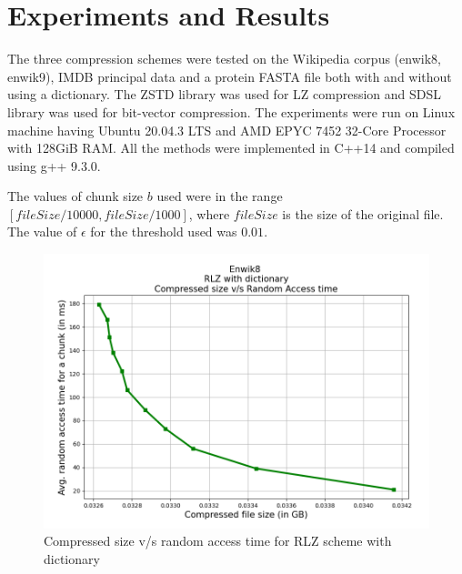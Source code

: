 \section{Experiments and Results}
The three compression schemes were tested on the Wikipedia corpus (enwik8, enwik9), IMDB principal data and a protein FASTA file both with and without using a dictionary. The ZSTD library was used for LZ compression and SDSL library was used for bit-vector compression. The experiments were run on Linux machine having Ubuntu 20.04.3 LTS and AMD EPYC 7452 32-Core Processor with 128GiB RAM. All the methods were implemented in C++14 and compiled using g++ 9.3.0. 

The values of chunk size $b$ used were in the range $[fileSize / 10000, fileSize / 1000]$, where $fileSize$ is the size of the original file. The value of $\epsilon$ for the threshold used was $0.01$.

\begin{figure}[H]
    \centering
    \includegraphics[width=\textwidth/2]{Figs/Enwik8_RLZ_dict.png}
    \caption{Compressed size v/s random access time for RLZ scheme with dictionary}
    \label{fig:enwik8_rlz_dict}
\end{figure}

